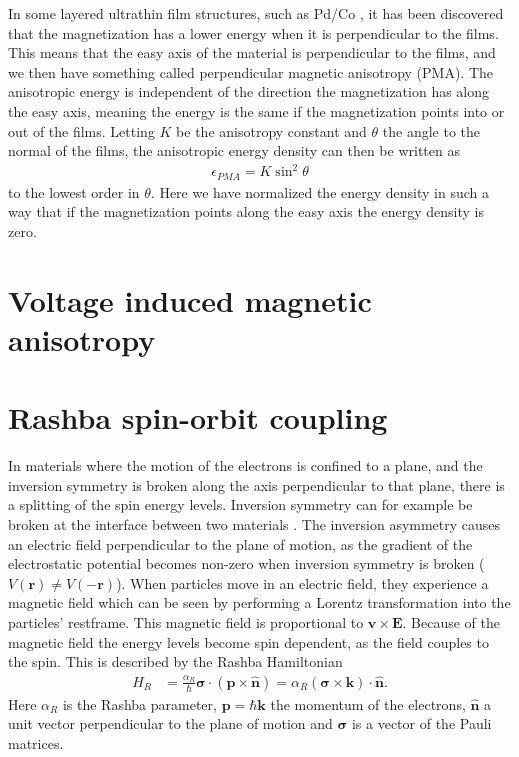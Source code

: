 \documentclass[12pt, a4paper, twoside, openright]{report}
\numberwithin{equation}{chapter}
\numberwithin{figure}{chapter}
\numberwithin{table}{chapter}
\begin{document}
In some layered ultrathin film structures, such as Pd/Co \cite{Carcia1985}, it has been discovered that the magnetization has a lower energy when it is perpendicular to the films. This means that the easy axis of the material is perpendicular to the films, and we then have something called perpendicular magnetic anisotropy (PMA). The anisotropic energy is independent of the direction the magnetization has along the easy axis, meaning the energy is the same if the magnetization points into or out of the films. Letting $K$ be the anisotropy constant and $\theta$ the angle to the normal of the films, the anisotropic energy density can then be written as
\begin{align}
\epsilon_{PMA} = K\sin^2\theta \label{eq:PMADensity}
\end{align} 
to the lowest order in $\theta$. Here we have normalized the energy density in such a way that if the magnetization points along the easy axis the energy density is zero.
\section{Voltage induced magnetic anisotropy}

\section{Rashba spin-orbit coupling}
In materials where the motion of the electrons is confined to a plane, and the inversion symmetry is broken along the axis perpendicular to that plane, there is a splitting of the spin energy levels. Inversion symmetry can for example be broken at the interface between two materials \cite{Heide2006}. The inversion asymmetry causes an electric field perpendicular to the plane of motion, as the gradient of the electrostatic potential becomes non-zero when inversion symmetry is broken ($V(\mathbold{r}) \neq V(-\mathbold{r})$). When particles move in an electric field, they experience a magnetic field which can be seen by performing a Lorentz transformation into the particles' restframe. This magnetic field is proportional to $\mathbold{v}\times\mathbold{E}$. Because of the magnetic field the energy levels become spin dependent, as the field couples to the spin. This is described by the Rashba Hamiltonian \citep{BychovRashba1984}
\begin{align}
H_R &= \frac{\alpha_R}{\hbar}\mathbold{\sigma}\cdot(\mathbold{p}\times\mathbold{\hat{n}}) = \alpha_R (\mathbold{\sigma}\times\mathbold{k})\cdot\mathbold{\hat{n}}.
\label{eq:RashbaH}
\end{align}
Here $\alpha_R$ is the Rashba parameter, $\mathbold{p} = \hbar\mathbold{k}$ the momentum of the electrons, $\mathbold{\hat{n}}$ a unit vector perpendicular to the plane of motion and $\mathbold{\sigma}$ is a vector of the Pauli matrices.
\end{document}
